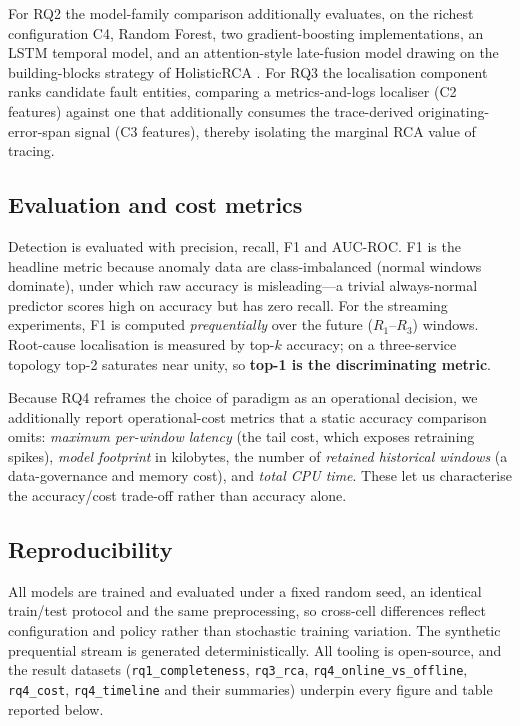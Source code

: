 \documentclass[acmsmall]{acmart}
\begin{document}
For RQ2 the model-family comparison additionally evaluates, on the richest configuration C4, Random Forest, two gradient-boosting implementations, an LSTM temporal model, and an attention-style late-fusion model drawing on the building-blocks strategy of HolisticRCA \cite{han2024}. For RQ3 the localisation component ranks candidate fault entities, comparing a metrics-and-logs localiser (C2 features) against one that additionally consumes the trace-derived originating-error-span signal (C3 features), thereby isolating the marginal RCA value of tracing.

\subsection{Evaluation and cost metrics}\label{sec:method-metrics}

Detection is evaluated with precision, recall, F1 and AUC-ROC. F1 is the headline metric because anomaly data are class-imbalanced (normal windows dominate), under which raw accuracy is misleading---a trivial always-normal predictor scores high on accuracy but has zero recall. For the streaming experiments, F1 is computed \emph{prequentially} over the future ($R_1$--$R_3$) windows. Root-cause localisation is measured by top-$k$ accuracy; on a three-service topology top-2 saturates near unity, so \textbf{top-1 is the discriminating metric}.

Because RQ4 reframes the choice of paradigm as an operational decision, we additionally report operational-cost metrics that a static accuracy comparison omits: \emph{maximum per-window latency} (the tail cost, which exposes retraining spikes), \emph{model footprint} in kilobytes, the number of \emph{retained historical windows} (a data-governance and memory cost), and \emph{total CPU time}. These let us characterise the accuracy/cost trade-off rather than accuracy alone.

\subsection{Reproducibility}\label{sec:method-repro}

All models are trained and evaluated under a fixed random seed, an identical train/test protocol and the same preprocessing, so cross-cell differences reflect configuration and policy rather than stochastic training variation. The synthetic prequential stream is generated deterministically. All tooling is open-source, and the result datasets (\texttt{rq1\_completeness}, \texttt{rq3\_rca}, \texttt{rq4\_online\_vs\_offline}, \texttt{rq4\_cost}, \texttt{rq4\_timeline} and their summaries) underpin every figure and table reported below.
\end{document}
